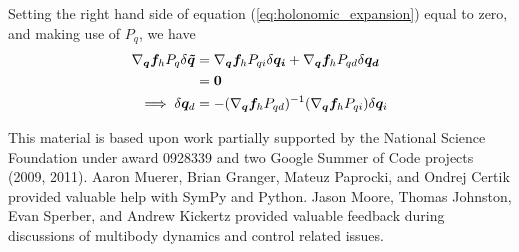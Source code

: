 \documentclass{svjour3}                     %
\begin{document}
Setting the right hand side of equation (\ref{eq:holonomic_expansion}) equal to
zero, and making use of $P_q$, we have
\begin{align}
  \nabla_{\bm{q}}\bm{f}_{h} P_{q} \delta \bm{\tilde{q}} &=
  \nabla_{\bm{q}}\bm{f}_{h} P_{qi} \delta \bm{q_i} +
  \nabla_{\bm{q}}\bm{f}_{h} P_{qd} \delta \bm{q_d}\notag\\
  &= \bm{0}\notag\\
  \implies \delta \bm{q}_d &= -(\nabla_{\bm{q}}\bm{f}_{h} P_{qd})^{-1}
  (\nabla_{\bm{q}}\bm{f}_{h} P_{qi}) \delta \bm{q}_i
\end{align}

\begin{acknowledgements}
  This material is based upon work partially supported by the National Science
  Foundation under award 0928339 and two Google Summer of Code projects (2009,
  2011).  Aaron Muerer, Brian Granger, Mateuz Paprocki, and Ondrej Certik
  provided valuable help with SymPy and Python.  Jason Moore, Thomas Johnston,
  Evan Sperber, and Andrew Kickertz provided valuable feedback during
  discussions of multibody dynamics and control related issues.
\end{acknowledgements}

\end{document}
